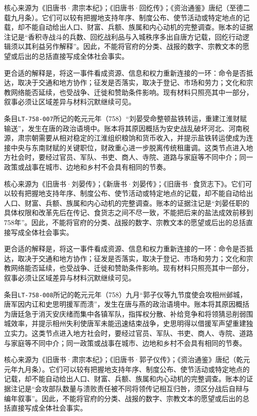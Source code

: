 核心来源为《旧唐书·肃宗本纪》；《旧唐书·回纥传》；《资治通鉴》唐纪（至德二载九月条）。它们可以较有把握地支持年序、制度公布、使节活动或特定地点的记载，却不能自动给出人口、财富、兵额、族属和内心动机的完整调查。账本的证据注记是“香积寺战斗的兵数、回纥战利品与入城秩序多出自唐方记载，回纥行动逻辑须以其利益另作解释”。因此，不能将官府的分类、战报的数字、宗教文本的愿望或后出的总括直接写成全体社会事实。

更合适的解释是，将这一事件看成资源、信息和权力重新连接的一环：命令是否抵达，取决于交通和地方协作；征发是否落实，取决于登记、市场和劳力；文化和宗教网络能否延续，也受战争、迁徙和赞助条件影响。现有材料只照亮其中一部分，叙事必须让区域差异与材料沉默继续可见。

条目\texttt{LT-758-007}所记的乾元元年（758）“刘晏受命整顿盐铁转运，重建江淮财赋输送”，发生在唐的政治语境中。账本将其原因概括为安史战乱破坏河北、河南税源，肃宗朝需要从相对稳定的江淮组织粮饷和货币收入，并提示盐铁转运使成为连接中央与东南财赋的关键职位，财政重心进一步脱离传统租庸调。这类节点进入地方社会时，要经过官员、军队、书吏、商人、寺院、道路与家庭等不同中介；同一政策或战事在城市、边地和乡村不会具有相同的节奏。

核心来源为《旧唐书·刘晏传》；《新唐书·刘晏传》；《旧唐书·食货志下》。它们可以较有把握地支持年序、制度公布、使节活动或特定地点的记载，却不能自动给出人口、财富、兵额、族属和内心动机的完整调查。账本的证据注记是“刘晏任职的具体权限和改革先后在传记、食货志之间不尽一致，不能把后来的盐法成效前移到758年”。因此，不能将官府的分类、战报的数字、宗教文本的愿望或后出的总括直接写成全体社会事实。

更合适的解释是，将这一事件看成资源、信息和权力重新连接的一环：命令是否抵达，取决于交通和地方协作；征发是否落实，取决于登记、市场和劳力；文化和宗教网络能否延续，也受战争、迁徙和赞助条件影响。现有材料只照亮其中一部分，叙事必须让区域差异与材料沉默继续可见。

条目\texttt{LT-758-008}所记的乾元元年（758）九月“郭子仪等九节度使会攻相州邺城，唐军因内讧和史思明援军而溃”，发生在唐与燕的政治语境中。账本将其原因概括为唐廷急于消灭安庆绪而集中各镇军队，指挥权分散、补给竞争和将领猜忌削弱围城效率，并提示相州失利使唐军未能迅速结束战争，史思明得以借援军声望重建独立实力。这类节点进入地方社会时，要经过官员、军队、书吏、商人、寺院、道路与家庭等不同中介；同一政策或战事在城市、边地和乡村不会具有相同的节奏。

核心来源为《旧唐书·肃宗本纪》；《旧唐书·郭子仪传》；《资治通鉴》唐纪（乾元元年九月条）。它们可以较有把握地支持年序、制度公布、使节活动或特定地点的记载，却不能自动给出人口、财富、兵额、族属和内心动机的完整调查。账本的证据注记是“会攻部队数量与溃败责任被不同将领传记相互归咎，须区分战后自辩与编年叙事”。因此，不能将官府的分类、战报的数字、宗教文本的愿望或后出的总括直接写成全体社会事实。

